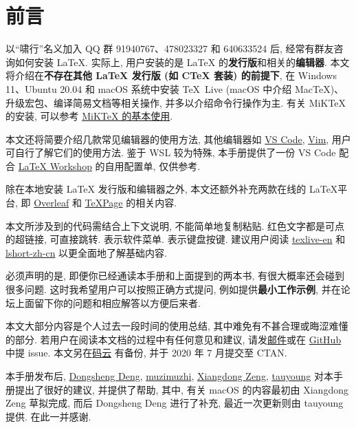 
\chapter*{前言}

以``啸行''名义加入 QQ 群 91940767、478023327 和 640633524 后,
经常有群友咨询如何安装 \LaTeX.
实际上,
用户安装的是 \LaTeX{} 的\textbf{发行版}和相关的\textbf{编辑器}.
本文将介绍在\textbf{不存在其他 \LaTeX{} 发行版 (如 C\TeX{} 套装) 的前提下},
在 Windows 11、Ubuntu 20.04 和 macOS 系统中安装
\TeX{}~Live (macOS 中介绍 Mac\TeX)、升级宏包、编译简易文档等相关操作,
并多以介绍命令行操作为主.
有关 MiK\TeX{} 的安装,
可以参考 \href{https://camusecao.top/2020-05-09/MiKTeX/}{MiK\TeX{} 的基本使用}.

本文还将简要介绍几款常见编辑器的使用方法,
其他编辑器如 \href{https://code.visualstudio.com/}{VS Code},
\href{https://www.vim.org/}{Vim},
用户可自行了解它们的使用方法.
鉴于 WSL 较为特殊,
本手册提供了一份 VS Code 配合
\href{https://marketplace.visualstudio.com/items?itemName=James-Yu.latex-workshop}{LaTeX Workshop}
的自用配置单,
仅供参考.

除在本地安装 \LaTeX{} 发行版和编辑器之外,
本文还额外补充两款在线的 \LaTeX 平台,
即 \href{http://www.overleaf.com}{Overleaf} 和 \href{https://www.texpage.com/}{TeXPage} 的相关内容.

本文所涉及到的代码需结合上下文说明, 不能简单地复制粘贴. 红色文字都是可点的超链接, 可直接跳转.
 表示软件菜单.  表示键盘按键.
建议用户阅读 \href{https://www.tug.org/texlive/doc/texlive-en/texlive-en.pdf}{texlive-en}
和 \href{http://mirrors.ctan.org/info/lshort/chinese/lshort-zh-cn.pdf}{lshort-zh-cn}
以更全面地了解基础内容.

必须声明的是,
即便你已经通读本手册和上面提到的两本书,
有很大概率还会碰到很多问题.
这时我希望用户可以按照正确方式提问,
例如提供\textbf{最小工作示例},
并在论坛上面留下你的问题和相应解答以方便后来者.

本文大部分内容是个人过去一段时间的使用总结, 其中难免有不甚合理或晦涩难懂的部分. 
若用户在阅读本文档的过程中有任何意见和建议,
请发\href{mailto:ranwang.osbert@outlook.com}{邮件}或在
\href{https://github.com/OsbertWang/install-latex-guide-zh-cn/}{GitHub} 中提 issue.
本文另在\href{https://gitee.com/OsbertWang/install-latex-guide-zh-cn}{码云}%
有备份,
并于 2020 年 7 月提交至 CTAN.


本手册发布后,
\href{https://github.com/EthanDeng}{Dongsheng Deng},
\href{https://github.com/muzimuzhi}{muzimuzhi},
\href{https://github.com/stone-zeng}{Xiangdong Zeng},
\href{https://github.com/tauyoungsama}{tauyoung}
对本手册提出了很好的建议, 并提供了帮助,
其中, 有关 macOS 的内容最初由 Xiangdong Zeng 草拟完成,
而后 Dongsheng Deng 进行了补充,
最近一次更新则由 tauyoung 提供.
在此一并感谢.
